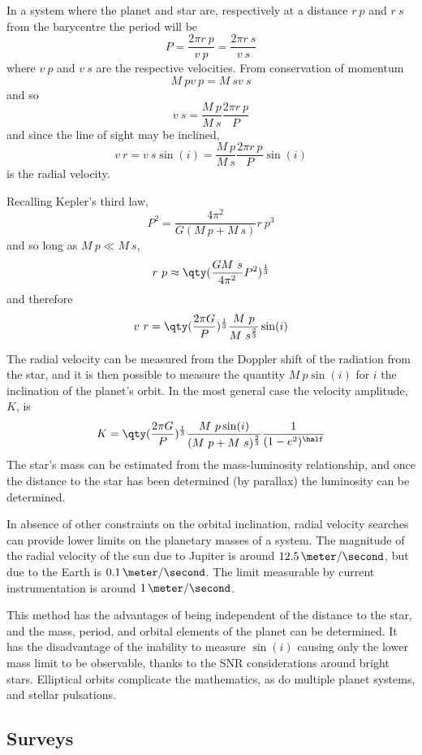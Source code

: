 In a system where the planet and star are, respectively at a distance
$r~p$ and $r~s$ from the barycentre the period will be
\[ P = \frac{2 \pi r~p}{v~p} = \frac{2 \pi r~s}{v~s} \] where $v~p$
and $v~s$ are the respective velocities. From conservation of momentum 
\[ M~p v~p = M~s v~s \] and so
\[ v~s = \frac{M~p}{M~s} \frac{2 \pi r~p}{P} \]
and since the line of sight may be inclined,
\[ v~r = v~s \sin(i) = \frac{M~p}{M~s} \frac{2 \pi r~p}{P} \sin(i) \]
is the radial velocity.

Recalling Kepler's third law,
\[ P^2 = \frac{4 \pi^2}{G(M~p + M~s)} r~p^3 \]
and so long as $M~p \ll M~s$,
\[ r~p \approx \qty( \frac{G M~s}{4 \pi^2} P^2 )^{\frac{1}{3}} \]
and therefore
\begin{equation}
  \label{eq:12}
  v~r = \qty( \frac{2 \pi G}{P})^{\frac{1}{3}} \frac{M~p}{M~s^{\frac{2}{3}}} \sin(i)
\end{equation}

The radial velocity can be measured from the Doppler shift of the
radiation from the star, and it is then possible to measure the
quantity $M~p \sin(i)$ for $i$ the inclination of the planet's
orbit. In the most general case the velocity amplitude, $K$, is
\begin{equation}
  \label{eq:18}
  K = \qty( \frac{2 \pi G}{P})^{\frac{1}{3}} \frac{M~p \sin(i)}{(M~p + M~s)^{\frac{2}{3}}} \frac{1}{(1-e^2)^{\half}}
\end{equation}
The star's mass can be estimated from the mass-luminosity
relationship, and once the distance to the star has been determined
(by parallax) the luminosity can be determined.

In absence of other constraints on the orbital inclination, radial
velocity searches can provide lower limits on the planetary masses of
a system. The magnitude of the radial velocity of the sun due to
Jupiter is around $12.5\,\meter/\second$, but due to the Earth is
$0.1\,\meter/\second$. The limit measurable by current instrumentation
is around $1\,\meter/\second$.

This method has the advantages of being independent of the distance to
the star, and the mass, period, and orbital elements of the planet can
be determined. It has the disadvantage of the inability to measure
$\sin(i)$ causing only the lower mass limit to be observable, thanks
to the SNR considerations around bright stars. Elliptical orbits
complicate the mathematics, as do multiple planet systems, and stellar
pulsations.

\subsection{Surveys}
\label{sec:surveys-1}

